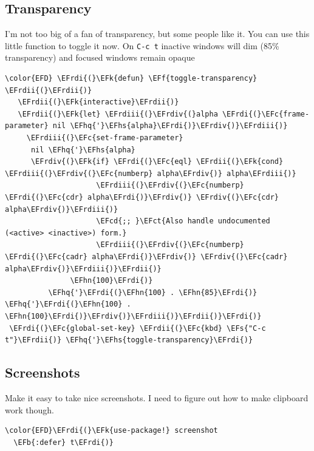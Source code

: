 \documentclass{scrartcl}
\newcommand{\EFk}[1]{\textcolor{EFk}{#1}} %
\newcommand{\EFs}[1]{\textcolor{EFs}{#1}} %
\newcommand{\EFb}[1]{\textcolor{EFb}{#1}} %
\newcommand{\EFct}[1]{\textcolor{EFct}{#1}} %
\newcommand{\EFc}[1]{\textcolor{EFc}{#1}} %
\newcommand{\EFf}[1]{\textcolor{EFf}{#1}} %
\newcommand{\EFcd}[1]{\textcolor{EFcd}{#1}} %
\newcommand{\EFhn}[1]{\textcolor{EFhn}{\textbf{#1}}} %
\newcommand{\EFhq}[1]{\textcolor{EFhq}{#1}} %
\newcommand{\EFhs}[1]{\textcolor{EFhs}{#1}} %
\newcommand{\EFrdi}[1]{\textcolor{EFrdi}{#1}} %
\newcommand{\EFrdii}[1]{\textcolor{EFrdii}{#1}} %
\newcommand{\EFrdiii}[1]{\textcolor{EFrdiii}{#1}} %
\newcommand{\EFrdiv}[1]{\textcolor{EFrdiv}{#1}} %
\begin{document}
\subsection{Transparency}
\label{sec:orge30fd49}
I'm not too big of a fan of transparency, but some people like it. You can use
this little function to toggle it now. On \texttt{C-c t} inactive windows will dim (85\%
transparency)  and focused windows remain opaque
\begin{Code}
\begin{Verbatim}[]
\color{EFD} \EFrdi{(}\EFk{defun} \EFf{toggle-transparency} \EFrdii{(}\EFrdii{)}
   \EFrdii{(}\EFk{interactive}\EFrdii{)}
   \EFrdii{(}\EFk{let} \EFrdiii{(}\EFrdiv{(}alpha \EFrdi{(}\EFc{frame-parameter} nil \EFhq{'}\EFhs{alpha}\EFrdi{)}\EFrdiv{)}\EFrdiii{)}
     \EFrdiii{(}\EFc{set-frame-parameter}
      nil \EFhq{'}\EFhs{alpha}
      \EFrdiv{(}\EFk{if} \EFrdi{(}\EFc{eql} \EFrdii{(}\EFk{cond} \EFrdiii{(}\EFrdiv{(}\EFc{numberp} alpha\EFrdiv{)} alpha\EFrdiii{)}
                     \EFrdiii{(}\EFrdiv{(}\EFc{numberp} \EFrdi{(}\EFc{cdr} alpha\EFrdi{)}\EFrdiv{)} \EFrdiv{(}\EFc{cdr} alpha\EFrdiv{)}\EFrdiii{)}
                     \EFcd{;; }\EFct{Also handle undocumented (<active> <inactive>) form.}
                     \EFrdiii{(}\EFrdiv{(}\EFc{numberp} \EFrdi{(}\EFc{cadr} alpha\EFrdi{)}\EFrdiv{)} \EFrdiv{(}\EFc{cadr} alpha\EFrdiv{)}\EFrdiii{)}\EFrdii{)}
               \EFhn{100}\EFrdi{)}
          \EFhq{'}\EFrdi{(}\EFhn{100} . \EFhn{85}\EFrdi{)} \EFhq{'}\EFrdi{(}\EFhn{100} . \EFhn{100}\EFrdi{)}\EFrdiv{)}\EFrdiii{)}\EFrdii{)}\EFrdi{)}
 \EFrdi{(}\EFc{global-set-key} \EFrdii{(}\EFc{kbd} \EFs{"C-c t"}\EFrdii{)} \EFhq{'}\EFhs{toggle-transparency}\EFrdi{)}
\end{Verbatim}
\end{Code}

\subsection{Screenshots}
\label{sec:org2d1b633}
Make it easy to take nice screenshots. I need to figure out how to make
clipboard work though.
\begin{Code}
\begin{Verbatim}[]
\color{EFD}\EFrdi{(}\EFk{use-package!} screenshot
  \EFb{:defer} t\EFrdi{)}
\end{Verbatim}
\end{Code}
\end{document}
